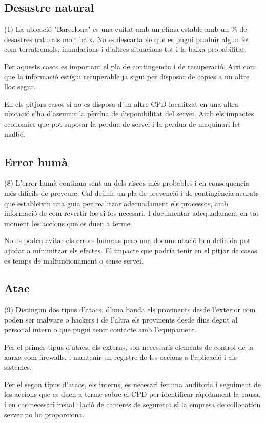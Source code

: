\documentclass[a4paper, 11pt]{article}
\begin{document}
\subsection{Desastre natural}
(1) La ubicació "Barcelona" es una cuitat amb un clima estable amb un \% de desastres naturals molt baix. No es descartable que es pugui produir algun fet com terratremols, inundacions i d'altres situacions tot i la baixa probabilitat.

Per aquests casos es important el pla de contingencia i de recuperació. Aixi com que la informació estigui recuperable ja sigui per disposar de copies a un altre lloc segur.

En els pitjors casos si no es disposa d'un altre CPD localitzat en una altra ubicació s'ha d'assumir la pèrdua de disponibilitat del servei. Amb els impactes economics que pot suposar la perdua de servei i la perdua de maquinari fet malbé.

\subsection{Error humà}
(8) L'error humà continua sent un dels riscos més probables i en consequencia més díficils de preveure. Cal definir un pla de prevenció i de contingència acurats que estableixin una guia per realitzar adecuadament els processos, amb informació de com revertir-los si fos necesari. I documentar adequadament en tot moment les accions que es duen a terme.

No es poden evitar els errors humans pero una documentació ben definida pot ajudar a mínimitzar els efectes. El impacte que podría tenir en el pitjor de casos es temps de malfuncionament o sense servei. 

\subsection{Atac}
(9) Distingim dos tipus d'atacs, d'una banda els provinents desde l'exterior com poden ser malware o hackers i de l'altra els provinents desde dins degut al personal intern o que pugui tenir contacte amb l'equipament. 

Per el primer tipus d'atacs, els externs, son necessaris elements de control de la xarxa com firewalls, i mantenir un registre de les accions a l'aplicació i als sistemes. 

Per el segon tipus d'atacs, els interns, es necesari fer una auditoria i seguiment de les accions que es duen a terme sobre el CPD per identificar ràpidament la causa, i en cas necesari instal·lació de cameres de seguretat si la empresa de collocation server no ho proporciona.
\end{document}
